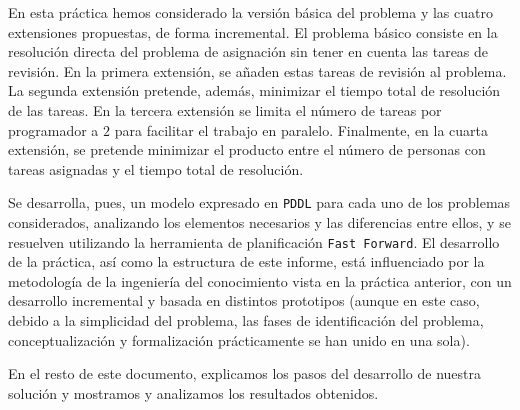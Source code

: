 En esta práctica hemos considerado la versión básica del problema y las cuatro 
extensiones propuestas, de forma incremental. El problema básico consiste en 
la resolución directa del problema de asignación sin tener en cuenta las 
tareas de revisión. En la primera extensión, se añaden estas tareas de 
revisión al problema. La segunda extensión pretende, además, minimizar el 
tiempo total de resolución de las tareas. En la tercera extensión se limita 
el número de tareas por programador a \(2\) para facilitar el trabajo en 
paralelo. Finalmente, en la cuarta extensión, se pretende minimizar el 
producto entre el número de personas con tareas asignadas y el tiempo total de 
resolución.

Se desarrolla, pues, un modelo expresado en \texttt{PDDL} para cada uno de los 
problemas considerados, analizando los elementos necesarios y las diferencias 
entre ellos, y se resuelven utilizando la herramienta de planificación 
\texttt{Fast Forward}. El desarrollo de la práctica, así como la estructura 
de este informe, está influenciado por la metodología de la ingeniería del 
conocimiento vista en la práctica anterior, con un desarrollo incremental y 
basada en distintos prototipos (aunque en este caso, debido a la simplicidad 
del problema, las fases de identificación del problema, conceptualización y 
formalización prácticamente se han unido en una sola).

En el resto de este documento, explicamos los pasos del desarrollo de nuestra 
solución y mostramos y analizamos los resultados obtenidos.

\clearpage



